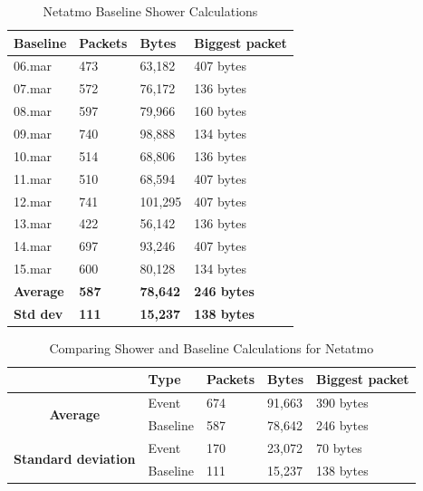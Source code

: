 \begin{table}[H]
    \centering
    \caption{Netatmo Baseline Shower Calculations}
    \begin{tabular}{|l|l|l|l|}
    \hline
        \textbf{Baseline} & \textbf{Packets} & \textbf{Bytes} & \textbf{Biggest   packet} \\ \hline
        06.mar            & 473              & 63,182          & 407 bytes                \\ \hline
        07.mar            & 572              & 76,172          & 136 bytes                \\ \hline
        08.mar            & 597              & 79,966          & 160 bytes                \\ \hline
        09.mar            & 740              & 98,888          & 134 bytes                \\ \hline
        10.mar            & 514              & 68,806          & 136 bytes                \\ \hline
        11.mar            & 510              & 68,594          & 407 bytes                \\ \hline
        12.mar            & 741              & 101,295         & 407 bytes                \\ \hline
        13.mar            & 422              & 56,142          & 136 bytes                \\ \hline
        14.mar            & 697              & 93,246          & 407 bytes                \\ \hline
        15.mar            & 600              & 80,128          & 134 bytes                \\ \hline
\textbf{Average}  & \textbf{587}     & \textbf{78,642} & \textbf{246 bytes}               \\ \hline
\textbf{Std dev}  & \textbf{111}     & \textbf{15,237} & \textbf{138 bytes}               \\ \hline
    \end{tabular}
    \label{tab:NetatmoBaselineShowerCalculations}
\end{table}

\begin{table}[H]
    \centering
    \caption{Comparing Shower and Baseline Calculations for Netatmo}
    \begin{tabular}{c|l|l|l|l|}
        \cline{2-5}
        \multicolumn{1}{l|}{} & \textbf{Type} & \textbf{Packets} & \textbf{Bytes} & \textbf{Biggest packet} \\ \hline
        \multicolumn{1}{|c|}{\multirow{2}{*}{\textbf{Average}}}  & Event & 674 & 91,663 & 390 bytes \\ \cline{2-5} 
        \multicolumn{1}{|c|}{}  & Baseline  & 587 & 78,642 & 246 bytes \\ \hline
        \multicolumn{1}{|c|}{\multirow{2}{*}{\textbf{Standard deviation}}} & Event & 170 & 23,072 & 70 bytes \\ \cline{2-5} 
        \multicolumn{1}{|c|}{} & Baseline & 111 & 15,237 & 138 bytes\\ \hline          
    \end{tabular}
    \label{tab:NetatmoComparingBaselineAndShowerCalculations}
\end{table}

